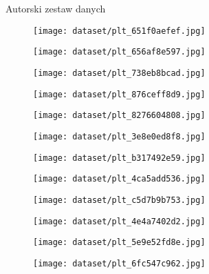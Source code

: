 \begin{easyappendix}{Autorski zestaw danych}

    \begin{figure}[H]
        \centering
        \texttt{[image: dataset/plt\_651f0aefef.jpg]}
    \end{figure}
    \begin{figure}[H]
        \centering
        \texttt{[image: dataset/plt\_656af8e597.jpg]}
    \end{figure}
    \begin{figure}[H]
        \centering
        \texttt{[image: dataset/plt\_738eb8bcad.jpg]}
    \end{figure}
    \begin{figure}[H]
        \centering
        \texttt{[image: dataset/plt\_876ceff8d9.jpg]}
    \end{figure}
    \begin{figure}[H]
        \centering
        \texttt{[image: dataset/plt\_8276604808.jpg]}
    \end{figure}
    \begin{figure}[H]
        \centering
        \texttt{[image: dataset/plt\_3e8e0ed8f8.jpg]}
    \end{figure}
    \begin{figure}[H]
        \centering
        \texttt{[image: dataset/plt\_b317492e59.jpg]}
    \end{figure}
    \begin{figure}[H]
        \centering
        \texttt{[image: dataset/plt\_4ca5add536.jpg]}
    \end{figure}
    \begin{figure}[H]
        \centering
        \texttt{[image: dataset/plt\_c5d7b9b753.jpg]}
    \end{figure}
    \begin{figure}[H]
        \centering
        \texttt{[image: dataset/plt\_4e4a7402d2.jpg]}
    \end{figure}
    \begin{figure}[H]
        \centering
        \texttt{[image: dataset/plt\_5e9e52fd8e.jpg]}
    \end{figure}
    \begin{figure}[H]
        \centering
        \texttt{[image: dataset/plt\_6fc547c962.jpg]}

\end{figure}
\end{easyappendix}
